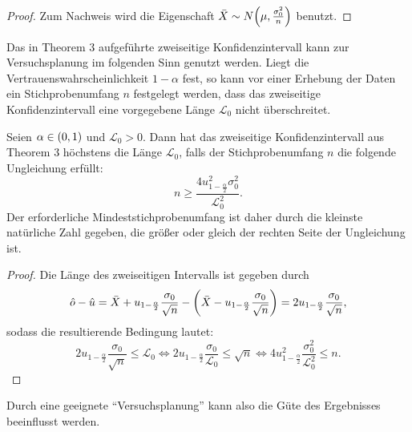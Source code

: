 \documentclass{lecture}
\begin{document}
    \begin{proof}
        Zum Nachweis wird die Eigenschaft \(\bar{X} \sim N\parentheses*{\mu, \frac{\sigma_0^2}{n}}\) benutzt.
    \end{proof}

    Das in Theorem 3 aufgeführte zweiseitige Konfidenzintervall kann zur Versuchsplanung im folgenden Sinn genutzt werden.
    Liegt die Vertrauenswahrscheinlichkeit \(1 - \alpha\) fest, so kann vor einer Erhebung der Daten ein Stichprobenumfang \(n\) festgelegt werden, dass das zweiseitige Konfidenzintervall eine vorgegebene Länge \(\mathcal{L}_0\) nicht überschreitet.

    \begin{theorem}
        Seien \(\alpha \in \parentheses*{0, 1}\) und \(\mathcal{L}_0 > 0\).
        Dann hat das zweiseitige Konfidenzintervall aus Theorem 3 höchstens die Länge \(\mathcal{L}_0\), falls der Stichprobenumfang \(n\) die folgende Ungleichung erfüllt:
        \[
            n \ge \frac{4u_{1 - \frac{\alpha}{2}}^2 \sigma_0^2}{\mathcal{L}_0^2}.
        \]
        Der erforderliche Mindeststichprobenumfang ist daher durch die kleinste natürliche Zahl gegeben, die größer oder gleich der rechten Seite der Ungleichung ist.
    \end{theorem}

    \begin{proof}
        Die Länge des zweiseitigen Intervalls ist gegeben durch
        \[
            \hat{o} - \hat{u} = \bar{X} + u_{1 - \frac{\alpha}{2}}\frac{\sigma_0}{\sqrt{n}} - \parentheses*{\bar{X} - u_{1 - \frac{\alpha}{2}}\frac{\sigma_0}{\sqrt{n}}} = 2u_{1 - \frac{\alpha}{2}}\frac{\sigma_0}{\sqrt{n}},
        \]
        sodass die resultierende Bedingung lautet:
        \[
            2u_{1 - \frac{\alpha}{2}}\frac{\sigma_0}{\sqrt{n}} \le \mathcal{L}_0 \iff 2u_{1 - \frac{\alpha}{2}}\frac{\sigma_0}{\mathcal{L}_0} \le \sqrt{n} \iff 4u_{1 - \frac{\alpha}{2}}^2 \frac{\sigma_0^2}{\mathcal{L}_0^2} \le n.
        \]
    \end{proof}

    Durch eine geeignete ``Versuchsplanung'' kann also die Güte des Ergebnisses beeinflusst werden.
\end{document}
